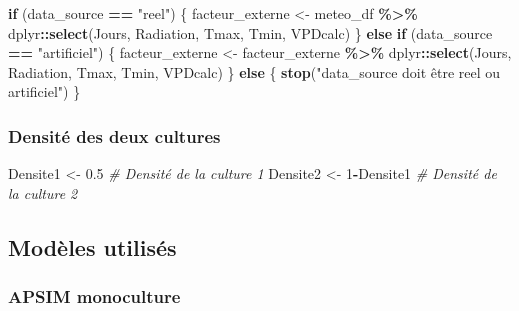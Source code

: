 \documentclass[
]{article}
\newenvironment{Shaded}{\begin{snugshade}}{\end{snugshade}}
\newcommand{\CommentTok}[1]{\textcolor[rgb]{0.56,0.35,0.01}{\textit{#1}}}
\newcommand{\ControlFlowTok}[1]{\textcolor[rgb]{0.13,0.29,0.53}{\textbf{#1}}}
\newcommand{\DecValTok}[1]{\textcolor[rgb]{0.00,0.00,0.81}{#1}}
\newcommand{\FloatTok}[1]{\textcolor[rgb]{0.00,0.00,0.81}{#1}}
\newcommand{\FunctionTok}[1]{\textcolor[rgb]{0.13,0.29,0.53}{\textbf{#1}}}
\newcommand{\NormalTok}[1]{#1}
\newcommand{\OtherTok}[1]{\textcolor[rgb]{0.56,0.35,0.01}{#1}}
\newcommand{\SpecialCharTok}[1]{\textcolor[rgb]{0.81,0.36,0.00}{\textbf{#1}}}
\newcommand{\StringTok}[1]{\textcolor[rgb]{0.31,0.60,0.02}{#1}}
\begin{document}
\begin{Shaded}
\begin{Highlighting}[]
\ControlFlowTok{if}\NormalTok{ (data\_source }\SpecialCharTok{==} \StringTok{"reel"}\NormalTok{) \{}
\NormalTok{  facteur\_externe }\OtherTok{\textless{}{-}}\NormalTok{ meteo\_df }\SpecialCharTok{\%\textgreater{}\%}
\NormalTok{    dplyr}\SpecialCharTok{::}\FunctionTok{select}\NormalTok{(Jours, Radiation, Tmax, Tmin, VPDcalc)}
\NormalTok{\} }\ControlFlowTok{else} \ControlFlowTok{if}\NormalTok{ (data\_source }\SpecialCharTok{==} \StringTok{"artificiel"}\NormalTok{) \{}
\NormalTok{  facteur\_externe }\OtherTok{\textless{}{-}}\NormalTok{ facteur\_externe }\SpecialCharTok{\%\textgreater{}\%}
\NormalTok{    dplyr}\SpecialCharTok{::}\FunctionTok{select}\NormalTok{(Jours, Radiation, Tmax, Tmin, VPDcalc)}
\NormalTok{\} }\ControlFlowTok{else}\NormalTok{ \{}
  \FunctionTok{stop}\NormalTok{(}\StringTok{"data\_source doit être \textquotesingle{}reel\textquotesingle{} ou \textquotesingle{}artificiel\textquotesingle{}"}\NormalTok{)}
\NormalTok{\}}
\end{Highlighting}
\end{Shaded}

\subsubsection{Densité des deux
cultures}\label{densituxe9-des-deux-cultures}

\begin{Shaded}
\begin{Highlighting}[]
\NormalTok{Densite1 }\OtherTok{\textless{}{-}} \FloatTok{0.5} \CommentTok{\# Densité de la culture 1 }
\NormalTok{Densite2 }\OtherTok{\textless{}{-}} \DecValTok{1}\SpecialCharTok{{-}}\NormalTok{Densite1 }\CommentTok{\# Densité de la culture 2 }
\end{Highlighting}
\end{Shaded}

\subsection{Modèles utilisés}\label{moduxe8les-utilisuxe9s}

\subsubsection{APSIM monoculture}\label{apsim-monoculture}
\end{document}
